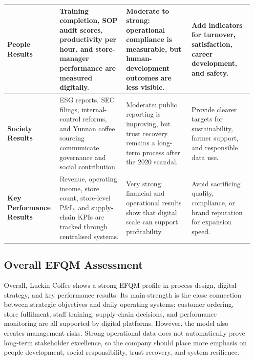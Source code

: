 \documentclass[12pt,a4paper]{article}
\begin{document}
\begin{landscape}
\begin{table}[H]
\begin{tabularx}{\linewidth}{P{3.0cm}P{6.6cm}P{6.6cm}Y}
\midrule
\textbf{People Results} & Training completion, SOP audit scores, productivity per hour, and store-manager performance are measured digitally. & Moderate to strong: operational compliance is measurable, but human-development outcomes are less visible. & Add indicators for turnover, satisfaction, career development, and safety. \\
\midrule
\textbf{Society Results} & ESG reports, SEC filings, internal-control reforms, and Yunnan coffee sourcing communicate governance and social contribution. & Moderate: public reporting is improving, but trust recovery remains a long-term process after the 2020 scandal. & Provide clearer targets for sustainability, farmer support, and responsible data use. \\
\midrule
\textbf{Key Performance Results} & Revenue, operating income, store count, store-level P\&L, and supply-chain KPIs are tracked through centralised systems. & Very strong: financial and operational results show that digital scale can support profitability. & Avoid sacrificing quality, compliance, or brand reputation for expansion speed. \\
\bottomrule
\end{tabularx}
\end{table}
\end{landscape}

\subsection{Overall EFQM Assessment}
Overall, Luckin Coffee shows a strong EFQM profile in process design, digital strategy, and key performance results. Its main strength is the close connection between strategic objectives and daily operating systems: customer ordering, store fulfilment, staff training, supply-chain decisions, and performance monitoring are all supported by digital platforms. However, the model also creates management risks. Strong operational data does not automatically prove long-term stakeholder excellence, so the company should place more emphasis on people development, social responsibility, trust recovery, and system resilience.
\end{document}
